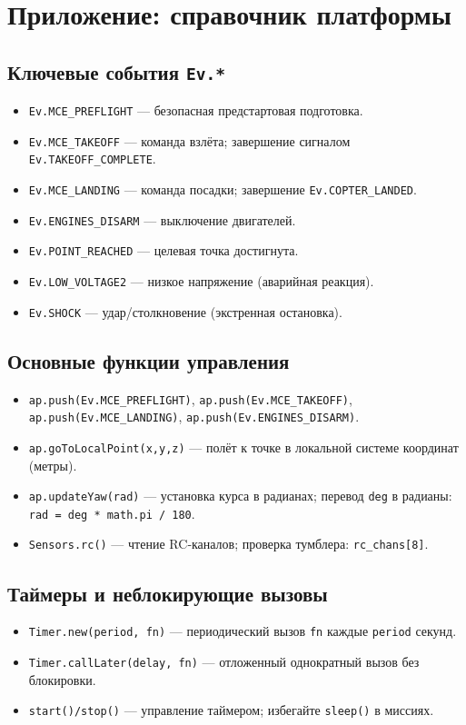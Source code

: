 \section{Приложение: справочник платформы}
\subsection{Ключевые события \texttt{Ev.*}}
\begin{itemize}
  \item \texttt{Ev.MCE\_PREFLIGHT} — безопасная предстартовая подготовка.
  \item \texttt{Ev.MCE\_TAKEOFF} — команда взлёта; завершение сигналом \texttt{Ev.TAKEOFF\_COMPLETE}.
  \item \texttt{Ev.MCE\_LANDING} — команда посадки; завершение \texttt{Ev.COPTER\_LANDED}.
  \item \texttt{Ev.ENGINES\_DISARM} — выключение двигателей.
  \item \texttt{Ev.POINT\_REACHED} — целевая точка достигнута.
  \item \texttt{Ev.LOW\_VOLTAGE2} — низкое напряжение (аварийная реакция).
  \item \texttt{Ev.SHOCK} — удар/столкновение (экстренная остановка).
\end{itemize}

\subsection{Основные функции управления}
\begin{itemize}
  \item \texttt{ap.push(Ev.MCE\_PREFLIGHT)}, \texttt{ap.push(Ev.MCE\_TAKEOFF)}, \texttt{ap.push(Ev.MCE\_LANDING)}, \texttt{ap.push(Ev.ENGINES\_DISARM)}.
  \item \texttt{ap.goToLocalPoint(x,y,z)} — полёт к точке в локальной системе координат (метры).
  \item \texttt{ap.updateYaw(rad)} — установка курса в радианах; перевод \texttt{deg} в радианы: \texttt{rad = deg * math.pi / 180}.
  \item \texttt{Sensors.rc()} — чтение RC‑каналов; проверка тумблера: \texttt{rc\_chans[8]}.
\end{itemize}

\subsection{Таймеры и неблокирующие вызовы}
\begin{itemize}
  \item \texttt{Timer.new(period, fn)} — периодический вызов \texttt{fn} каждые \texttt{period} секунд.
  \item \texttt{Timer.callLater(delay, fn)} — отложенный однократный вызов без блокировки.
  \item \texttt{start()/stop()} — управление таймером; избегайте \texttt{sleep()} в миссиях.
\end{itemize}

